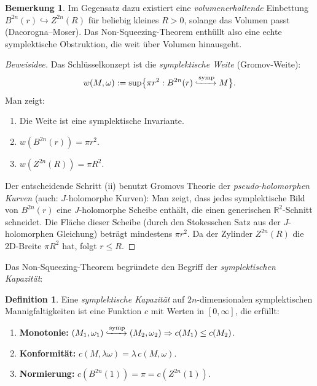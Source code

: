 \documentclass[12pt,a4paper]{amsart}
\theoremstyle{definition}
\newtheorem{definition}[theorem]{Definition}
\newtheorem{bemerkung}[theorem]{Bemerkung}
\begin{document}
\begin{bemerkung}
Im Gegensatz dazu existiert eine \emph{volumenerhaltende} Einbettung
$B^{2n}(r) \hookrightarrow Z^{2n}(R)$ für beliebig kleines $R > 0$, solange
das Volumen passt (Dacorogna--Moser).  Das Non-Squeezing-Theorem enthüllt also
eine echte symplektische Obstruktion, die weit über Volumen hinausgeht.
\end{bemerkung}

\begin{proof}[Beweisidee]
Das Schlüsselkonzept ist die \emph{symplektische Weite} (Gromov-Weite):
\[
  w(M, \omega) := \sup\bigl\{\pi r^2 : B^{2n}(r) \xhookrightarrow{\text{symp}} M\bigr\}.
\]
Man zeigt:
\begin{enumerate}[label=(\roman*)]
  \item Die Weite ist eine symplektische Invariante.
  \item $w(B^{2n}(r)) = \pi r^2$.
  \item $w(Z^{2n}(R)) = \pi R^2$.
\end{enumerate}
Der entscheidende Schritt (ii) benutzt Gromovs Theorie der
\emph{pseudo-holomorphen Kurven} (auch: $J$-holomorphe Kurven): Man zeigt,
dass jedes symplektische Bild von $B^{2n}(r)$ eine $J$-holomorphe Scheibe
enthält, die einen generischen $\mathbb{R}^2$-Schnitt schneidet.  Die Fläche
dieser Scheibe (durch den Stokesschen Satz aus der $J$-holomorphen Gleichung)
beträgt mindestens $\pi r^2$.  Da der Zylinder $Z^{2n}(R)$ die 2D-Breite
$\pi R^2$ hat, folgt $r \leq R$.
\end{proof}

Das Non-Squeezing-Theorem begründete den Begriff der \emph{symplektischen
Kapazität}:

\begin{definition}
Eine \emph{symplektische Kapazität} auf $2n$-dimensionalen symplektischen
Mannigfaltigkeiten ist eine Funktion $c$ mit Werten in $[0, \infty]$, die
erfüllt:
\begin{enumerate}[label=(\roman*)]
  \item \textbf{Monotonie:} $(M_1, \omega_1) \xhookrightarrow{\text{symp}}
    (M_2, \omega_2) \Rightarrow c(M_1) \leq c(M_2)$.
  \item \textbf{Konformität:} $c(M, \lambda\omega) = \lambda\, c(M,\omega)$.
  \item \textbf{Normierung:} $c(B^{2n}(1)) = \pi = c(Z^{2n}(1))$.
\end{enumerate}
\end{definition}

\end{document}
